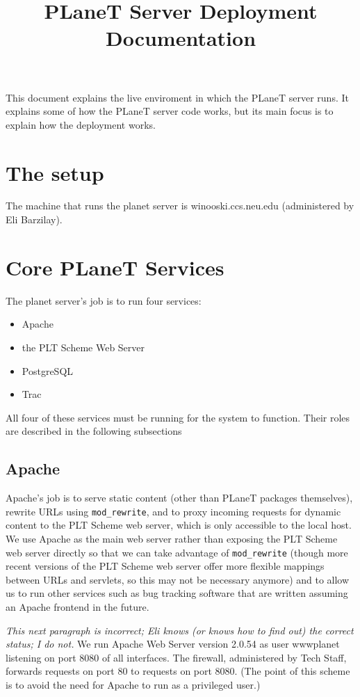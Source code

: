 \documentclass{article}
\title{PLaneT Server Deployment Documentation}
\begin{document}
\maketitle

This document explains the live enviroment in which the PLaneT server
runs. It explains some of how the PLaneT server code works, but its
main focus is to explain how the deployment works.

\section{The setup}

The machine that runs the planet server is winooski.ccs.neu.edu
(administered by Eli Barzilay).

\section{Core PLaneT Services}

The planet server's job is to run four services:
\begin{itemize}
\item Apache
\item the PLT Scheme Web Server
\item PostgreSQL
\item Trac
\end{itemize}

All four of these services must be running for the system to
function. Their roles are described in the following subsections

\subsection{Apache}

Apache's job is to serve static content (other than PLaneT packages
themselves), rewrite URLs using \texttt{mod\_rewrite}, and to proxy incoming
requests for dynamic content to the PLT Scheme web server, which is
only accessible to the local host. We use Apache as the main web
server rather than exposing the PLT Scheme web server directly so that
we can take advantage of \texttt{mod\_rewrite} (though more recent versions of
the PLT Scheme web server offer more flexible mappings between URLs
and servlets, so this may not be necessary anymore) and to allow us to
run other services such as bug tracking software that are written
assuming an Apache frontend in the future.

\textit{This next paragraph is incorrect; Eli knows (or knows how to
  find out) the correct status; I do not.}
We run Apache Web Server version 2.0.54 as user wwwplanet listening
on port 8080 of all interfaces. The firewall, administered by Tech
Staff, forwards requests on port 80 to requests on port 8080. (The
point of this scheme is to avoid the need for Apache to run as a
privileged user.)  
\end{document}
